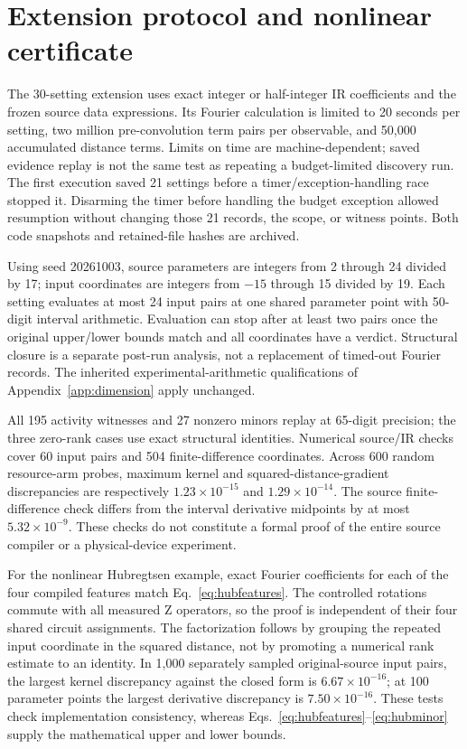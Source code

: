 \section{Extension protocol and nonlinear certificate}
\label{app:extension}
The 30-setting extension uses exact integer or half-integer IR
coefficients and the frozen source data expressions. Its Fourier
calculation is limited to 20 seconds per setting, two million
pre-convolution term pairs per observable, and 50,000 accumulated
distance terms. Limits on time are machine-dependent; saved evidence
replay is not the same test as repeating a budget-limited discovery run.
The first execution saved 21 settings before a timer/exception-handling
race stopped it. Disarming the timer before handling the budget
exception allowed resumption without changing those 21 records, the
scope, or witness points. Both code snapshots and retained-file hashes
are archived.

Using seed 20261003, source parameters are integers from 2 through 24
divided by 17; input coordinates are integers from $-15$ through 15
divided by 19. Each setting evaluates at most 24 input pairs at one
shared parameter point with 50-digit interval arithmetic. Evaluation
can stop after at least two pairs once the original upper/lower bounds
match and all coordinates have a verdict. Structural closure is a
separate post-run analysis, not a replacement of timed-out Fourier
records. The inherited experimental-arithmetic qualifications of
Appendix~\ref{app:dimension} apply unchanged.

All 195 activity witnesses and 27 nonzero minors replay at 65-digit
precision; the three zero-rank cases use exact structural identities.
Numerical source/IR checks cover 60 input pairs and 504 finite-difference
coordinates. Across 600 random resource-arm probes, maximum kernel
and squared-distance-gradient discrepancies are respectively
$1.23\times10^{-15}$ and $1.29\times10^{-14}$. The source finite-
difference check differs from the interval derivative midpoints by
at most $5.32\times10^{-9}$. These checks do not constitute a formal
proof of the entire source compiler or a physical-device experiment.

For the nonlinear Hubregtsen example, exact Fourier coefficients for
each of the four compiled features match Eq.~\eqref{eq:hubfeatures}.
The controlled rotations commute with all measured Z operators, so
the proof is independent of their four shared circuit assignments.
The factorization follows by grouping the repeated input coordinate
in the squared distance, not by promoting a numerical rank estimate
to an identity. In 1,000 separately sampled original-source input
pairs, the largest kernel discrepancy against the closed form is
$6.67\times10^{-16}$; at 100 parameter points the largest derivative
discrepancy is $7.50\times10^{-16}$. These tests check implementation
consistency, whereas Eqs.~\eqref{eq:hubfeatures}--\eqref{eq:hubminor}
supply the mathematical upper and lower bounds.

